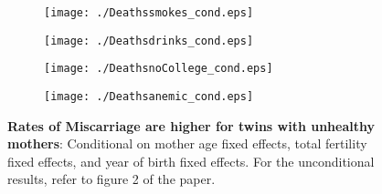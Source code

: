 \documentclass{nature}
\begin{document}
\begin{linenumbers}
\begin{spacing}{1}

\begin{figure}[htpb!]
\begin{subfigure}{.5\textwidth}
  \texttt{[image: ./Deathssmokes\_cond.eps]}
\end{subfigure}%
\begin{subfigure}{.5\textwidth}
  \texttt{[image: ./Deathsdrinks\_cond.eps]}
\end{subfigure}
\begin{subfigure}{.5\textwidth}
  \texttt{[image: ./DeathsnoCollege\_cond.eps]}
\end{subfigure}%
\begin{subfigure}{.5\textwidth}
  \texttt{[image: ./Deathsanemic\_cond.eps]}
\end{subfigure}
\vspace{5mm}
\caption{\textbf{Rates of Miscarriage are higher for twins with unhealthy mothers}: Conditional on mother age fixed effects, total fertility fixed effects, and year of birth fixed effects.  For the unconditional results, refer to figure 2 of the paper.}
\end{figure}
\end{spacing}


\end{linenumbers}
\end{document}

